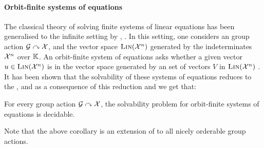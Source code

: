 \paragraph{Orbit-finite systems of equations} The classical theory of solving
finite systems of linear equations has been generalised to the infinite setting
by \cite{GHL22}, \cite[Section 9]{GHOLAS24}. In this setting, one considers an
 group action $\mathcal{G}\curvearrowright\mathcal{X}$, and the
vector space $\textsc{Lin}(\mathcal{X}^n)$ generated by the indeterminates $\mathcal{X}^n$ over
$\mathbb{K}$. An orbit-finite system of equations asks whether a given vector $u \in
\textsc{Lin}(\mathcal{X}^n)$ is in the vector space generated by an  set
of vectors $V$ in $\textsc{Lin}(\mathcal{X}^n)$ \cite[Section 9]{GHOLAS24}. It has been
shown that the solvability of these systems of equations reduces to the
 \cite[Theorem 68]{GHOLAS24}, and as a
consequence of this reduction and
 we get that:

\begin{corollary}\label{cor:lin solv}
  For every  group action $\mathcal{G}\curvearrowright\mathcal{X}$,
  the solvability problem for orbit-finite systems of equations
  is decidable.
\end{corollary}
%
Note that the above corollary is an extension of \cite[Theorem 6.1]{GHL22} to all nicely orderable group actions.
